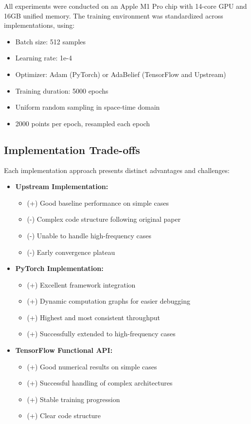 \documentclass[10pt,journal,compsoc,onecolumn]{IEEEtran}
\begin{document}
All experiments were conducted on an Apple M1 Pro chip with 14-core GPU and 16GB unified memory. The training environment was standardized across implementations, using:
\begin{itemize}
    \item Batch size: 512 samples
    \item Learning rate: 1e-4
    \item Optimizer: Adam (PyTorch) or AdaBelief (TensorFlow and Upstream)
    \item Training duration: 5000 epochs
    \item Uniform random sampling in space-time domain
    \item 2000 points per epoch, resampled each epoch
\end{itemize}

\subsection{Implementation Trade-offs}
Each implementation approach presents distinct advantages and challenges:

\begin{itemize}
    \item \textbf{Upstream Implementation:}
    \begin{itemize}
        \item (+) Good baseline performance on simple cases
        \item (-) Complex code structure following original paper
        \item (-) Unable to handle high-frequency cases
        \item (-) Early convergence plateau
    \end{itemize}
    
    \item \textbf{PyTorch Implementation:}
    \begin{itemize}
        \item (+) Excellent framework integration
        \item (+) Dynamic computation graphs for easier debugging
        \item (+) Highest and most consistent throughput
        \item (+) Successfully extended to high-frequency cases
    \end{itemize}
    
    \item \textbf{TensorFlow Functional API:}
    \begin{itemize}
        \item (+) Good numerical results on simple cases
        \item (+) Successful handling of complex architectures
        \item (+) Stable training progression
        \item (+) Clear code structure
    \end{itemize}
\end{itemize}
\end{document}
